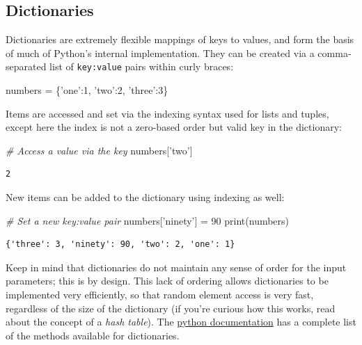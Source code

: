 \documentclass[]{article}
\newenvironment{Shaded}{}{}
\newcommand{\DecValTok}[1]{\textcolor[rgb]{0.25,0.63,0.44}{{#1}}}
\newcommand{\StringTok}[1]{\textcolor[rgb]{0.25,0.44,0.63}{{#1}}}
\newcommand{\CommentTok}[1]{\textcolor[rgb]{0.38,0.63,0.69}{\textit{{#1}}}}
\newcommand{\OperatorTok}[1]{\textcolor[rgb]{0.40,0.40,0.40}{{#1}}}
\newcommand{\BuiltInTok}[1]{{#1}}
\newcommand{\NormalTok}[1]{{#1}}
\begin{document}
\subsection{Dictionaries}\label{dictionaries}

Dictionaries are extremely flexible mappings of keys to values, and form
the basis of much of Python's internal implementation. They can be
created via a comma-separated list of \texttt{key:value} pairs within
curly braces:

\begin{Shaded}
\begin{Highlighting}[]
\NormalTok{numbers }\OperatorTok{=} \NormalTok{\{}\StringTok{'one'}\NormalTok{:}\DecValTok{1}\NormalTok{, }\StringTok{'two'}\NormalTok{:}\DecValTok{2}\NormalTok{, }\StringTok{'three'}\NormalTok{:}\DecValTok{3}\NormalTok{\}}
\end{Highlighting}
\end{Shaded}

Items are accessed and set via the indexing syntax used for lists and
tuples, except here the index is not a zero-based order but valid key in
the dictionary:

\begin{Shaded}
\begin{Highlighting}[]
\CommentTok{# Access a value via the key}
\NormalTok{numbers[}\StringTok{'two'}\NormalTok{]}
\end{Highlighting}
\end{Shaded}

\begin{verbatim}
2
\end{verbatim}

New items can be added to the dictionary using indexing as well:

\begin{Shaded}
\begin{Highlighting}[]
\CommentTok{# Set a new key:value pair}
\NormalTok{numbers[}\StringTok{'ninety'}\NormalTok{] }\OperatorTok{=} \DecValTok{90}
\BuiltInTok{print}\NormalTok{(numbers)}
\end{Highlighting}
\end{Shaded}

\begin{verbatim}
{'three': 3, 'ninety': 90, 'two': 2, 'one': 1}
\end{verbatim}

Keep in mind that dictionaries do not maintain any sense of order for
the input parameters; this is by design. This lack of ordering allows
dictionaries to be implemented very efficiently, so that random element
access is very fast, regardless of the size of the dictionary (if you're
curious how this works, read about the concept of a \emph{hash table}).
The \href{https://docs.python.org/3/library/stdtypes.html}{python
documentation} has a complete list of the methods available for
dictionaries.
\end{document}
